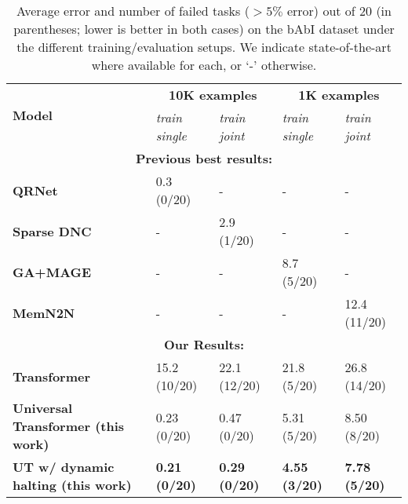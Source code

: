 \begin{table}[t!]
\centering
\begin{adjustbox}{max width=\textwidth}
\begin{tabular}{lllll}
& & & & \\ \toprule
\multirow{2}{*}{ \bf Model } & \multicolumn{2}{c}{ \bf 10K examples } & \multicolumn{2}{c}{ \bf 1K examples } \\ \cmidrule{2-5}
& \textit{train single} & \textit{train joint} & \textit{train single} & \textit{train joint} \\ \midrule
\multicolumn{5}{c}{\bf Previous best results:} \\ \midrule
\bf QRNet~\citep{seo2016query} & 0.3 (0/20) & - & - & - \\
\bf Sparse DNC~\citep{rae2016scaling} & - & 2.9 (1/20) & - & - \\
\bf GA+MAGE~\cite{dhingra2017linguistic} & - & - & 8.7 (5/20) & - \\
\bf MemN2N~\cite{sukhbaatar2015} & - & - & -  & 12.4 (11/20) \\\midrule
\multicolumn{5}{c}{\bf Our Results:} \\ \midrule
\bf Transformer~\citep{transformer} & 15.2 (10/20) & 22.1 (12/20) & 21.8 (5/20) & 26.8 (14/20) \\
\bf Universal Transformer (this work) & 0.23 (0/20) & 0.47 (0/20) & 5.31 (5/20) & 8.50 (8/20) \\
\bf UT w/ dynamic halting (this work) & {\bf 0.21 (0/20)} & {\bf 0.29 (0/20)} & {\bf 4.55 (3/20)} & {\bf 7.78 (5/20)} \\ \bottomrule
\end{tabular}
\end{adjustbox}
\caption{Average error and number of failed tasks ($> 5\%$ error) out of 20 (in parentheses; lower is better in both cases) on the bAbI dataset under the different training/evaluation setups. We indicate state-of-the-art where available for each, or `-' otherwise.}
\label{tab:babi-results}
\end{table}